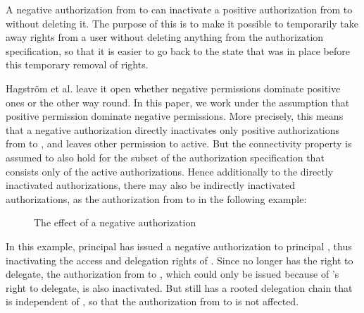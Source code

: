 \documentclass[runningheads]{llncs}
\begin{document}
A negative authorization from  to  can inactivate a positive authorization from  to  without deleting it. The purpose of this is to make it possible to temporarily take away rights from a user without deleting anything from the authorization specification, so that it is easier to go back to the state that was in place before this temporary removal of rights. 

Hagstr\"om et al. \cite{Hagstrom} leave it open whether negative permissions dominate positive ones or the other way round. In this paper, we work under the assumption that positive permission dominate negative permissions.
More precisely, this means that a negative authorization  directly inactivates only positive authorizations from  to , and leaves other permission to  active. But the connectivity property is assumed to also hold for the subset of the authorization specification that consists only of the active authorizations. Hence additionally to the directly inactivated authorizations, there may also be indirectly inactivated authorizations, as the authorization from  to  in the following example:
\vspace{-3mm}
\begin{figure}[H]
\center
{}
\caption{The effect of a negative authorization}
\end{figure}
\vspace{-3mm}
In this example, principal  has issued a negative authorization to principal , thus inactivating the access and delegation rights of . Since  no longer has the right to delegate, the authorization from  to , which could only be issued because of 's right to delegate, is also inactivated. But  still has a rooted delegation chain that is independent of , so that the authorization from  to  is not affected. 
\end{document}
